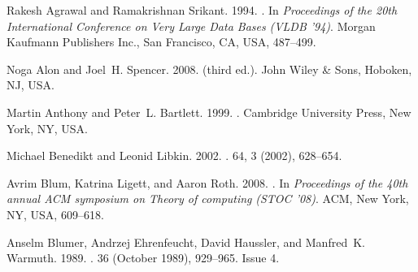\begin{thebibliography}{00}
{Rakesh Agrawal} {and} {Ramakrishnan Srikant}. 1994.
\newblock {}. In {\em Proceedings of the 20th International Conference on
  Very Large Data Bases} {\em (VLDB '94)}. Morgan Kaufmann Publishers Inc., San
  Francisco, CA, USA, 487--499.


{Noga Alon} {and} {Joel~H. Spencer}. 2008.
 (third ed.).
\newblock John Wiley {\&} Sons, Hoboken, NJ, USA.


{Martin Anthony} {and} {Peter~L. Bartlett}. 1999.
.
\newblock Cambridge University Press, New York, NY, USA.


{Michael Benedikt} {and} {Leonid Libkin}. 2002.
\newblock {}.
 {64}, 3 (2002), 628--654.
\newblock


{Avrim Blum}, {Katrina Ligett}, {and} {Aaron Roth}. 2008.
\newblock {}. In {\em Proceedings of the 40th annual ACM symposium on
  Theory of computing} {\em (STOC '08)}. ACM, New York, NY, USA, 609--618.
\newblock


{Anselm Blumer}, {Andrzej Ehrenfeucht}, {David Haussler}, {and} {Manfred~K.
  Warmuth}. 1989.
\newblock {}.
  {36} (October 1989), 929--965.
\newblock
Issue 4.



\end{thebibliography}
